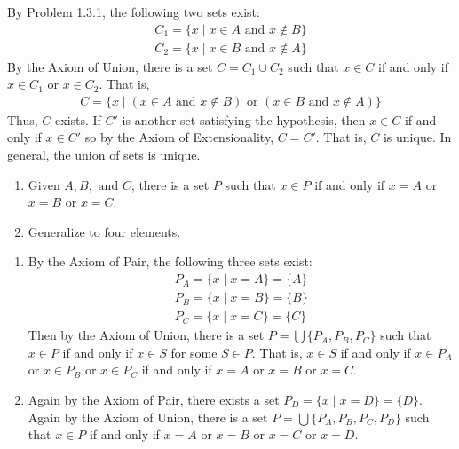 \documentclass[class=report, crop=false]{standalone}
\begin{document}
  \begin{solution}
    By Problem 1.3.1, the following two sets exist:
    \begin{gather*}
      C_{1} = \{x \mid x \in A \text{ and } x \notin B\} \\
      C_{2} = \{x \mid x \in B \text{ and } x \notin A\}
    \end{gather*}
    By the Axiom of Union, there is a set \(C = C_{1} \cup C_{2}\) such that \(x \in C\) if and only if \(x \in C_{1}\) or \(x \in C_{2}\). That is,
    \begin{gather*}
      C = \{x \mid \left(x \in A \text{ and } x \notin B\right) \text{ or } \left(x \in B \text{ and } x \notin A\right)\}
    \end{gather*}
    Thus, \(C\) exists. If \(C'\) is another set satisfying the hypothesis, then \(x \in C\) if and only if \(x \in C'\) so by the Axiom of Extensionality, \(C = C'\). That is, \(C\) is unique. In general, the union of sets is unique.
  \end{solution}

  \pagebreak

  \begin{problem}
    \hfill
    \begin{enumerate}[label={(\alph*)}]
      \item Given \(A, B, \text{ and } C\), there is a set \(P\) such that \(x \in P\) if and only if \(x = A\) or \(x = B\) or \(x = C\).

      \item Generalize to four elements.
    \end{enumerate}
  \end{problem}

  \begin{solution}
    \hfill
    \begin{enumerate}[label={(\alph*)}]
      \item By the Axiom of Pair, the following three sets exist:
      \begin{gather*}
        P_{A} = \{x \mid x = A\} = \{A\} \\
        P_{B} = \{x \mid x = B\} = \{B\} \\
        P_{C} = \{x \mid x = C\} = \{C\}
      \end{gather*}
      Then by the Axiom of Union, there is a set \(P = \bigcup \{P_{A}, P_{B}, P_{C}\}\) such that \(x \in P\) if and only if \(x \in S\) for some \(S \in P\).
      That is, \(x \in S\) if and only if \(x \in P_{A}\) or \(x \in P_{B}\) or \(x \in P_{C}\) if and only if \(x = A\) or \(x = B\) or \(x = C\).

      \item Again by the Axiom of Pair, there exists a set \(P_{D} = \{x \mid x = D\} = \{D\}\). Again by the Axiom of Union, there is a set \(P = \bigcup \{P_{A}, P_{B}, P_{C}, P_{D}\}\) such that \(x \in P\) if and only if \(x = A\) or \(x = B\) or \(x = C\) or \(x = D\).
    \end{enumerate}
  \end{solution}
\end{document}
